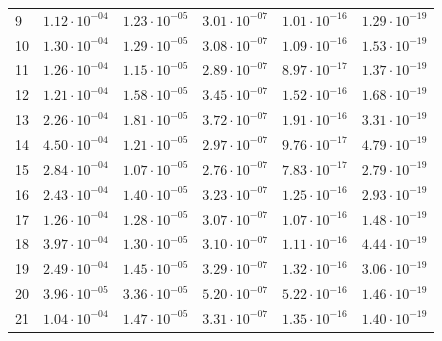 \begin{table}[h]
\begin{tabular}{llllll}
		9 &$\mathrm{1.12 \cdot 10^{-04}}$ & $\mathrm{1.23 \cdot 10^{-05}}$ & $\mathrm{3.01 \cdot 10^{-07}}$ & $\mathrm{1.01 \cdot 10^{-16}}$ & $\mathrm{1.29 \cdot 10^{-19}}$ \\
		10 &$\mathrm{1.30 \cdot 10^{-04}}$ & $\mathrm{1.29 \cdot 10^{-05}}$ & $\mathrm{3.08 \cdot 10^{-07}}$ & $\mathrm{1.09 \cdot 10^{-16}}$ & $\mathrm{1.53 \cdot 10^{-19}}$ \\
		11 &$\mathrm{1.26 \cdot 10^{-04}}$ & $\mathrm{1.15 \cdot 10^{-05}}$ & $\mathrm{2.89 \cdot 10^{-07}}$ & $\mathrm{8.97 \cdot 10^{-17}}$ & $\mathrm{1.37 \cdot 10^{-19}}$ \\
		12 &$\mathrm{1.21 \cdot 10^{-04}}$ & $\mathrm{1.58 \cdot 10^{-05}}$ & $\mathrm{3.45 \cdot 10^{-07}}$ & $\mathrm{1.52 \cdot 10^{-16}}$ & $\mathrm{1.68 \cdot 10^{-19}}$ \\
		13 &$\mathrm{2.26 \cdot 10^{-04}}$ & $\mathrm{1.81 \cdot 10^{-05}}$ & $\mathrm{3.72 \cdot 10^{-07}}$ & $\mathrm{1.91 \cdot 10^{-16}}$ & $\mathrm{3.31 \cdot 10^{-19}}$ \\
		14 &$\mathrm{4.50 \cdot 10^{-04}}$ & $\mathrm{1.21 \cdot 10^{-05}}$ & $\mathrm{2.97 \cdot 10^{-07}}$ & $\mathrm{9.76 \cdot 10^{-17}}$ & $\mathrm{4.79 \cdot 10^{-19}}$ \\
		15 &$\mathrm{2.84 \cdot 10^{-04}}$ & $\mathrm{1.07 \cdot 10^{-05}}$ & $\mathrm{2.76 \cdot 10^{-07}}$ & $\mathrm{7.83 \cdot 10^{-17}}$ & $\mathrm{2.79 \cdot 10^{-19}}$ \\
		16 &$\mathrm{2.43 \cdot 10^{-04}}$ & $\mathrm{1.40 \cdot 10^{-05}}$ & $\mathrm{3.23 \cdot 10^{-07}}$ & $\mathrm{1.25 \cdot 10^{-16}}$ & $\mathrm{2.93 \cdot 10^{-19}}$ \\
		17 &$\mathrm{1.26 \cdot 10^{-04}}$ & $\mathrm{1.28 \cdot 10^{-05}}$ & $\mathrm{3.07 \cdot 10^{-07}}$ & $\mathrm{1.07 \cdot 10^{-16}}$ & $\mathrm{1.48 \cdot 10^{-19}}$ \\
		18 &$\mathrm{3.97 \cdot 10^{-04}}$ & $\mathrm{1.30 \cdot 10^{-05}}$ & $\mathrm{3.10 \cdot 10^{-07}}$ & $\mathrm{1.11 \cdot 10^{-16}}$ & $\mathrm{4.44 \cdot 10^{-19}}$ \\
		19 &$\mathrm{2.49 \cdot 10^{-04}}$ & $\mathrm{1.45 \cdot 10^{-05}}$ & $\mathrm{3.29 \cdot 10^{-07}}$ & $\mathrm{1.32 \cdot 10^{-16}}$ & $\mathrm{3.06 \cdot 10^{-19}}$ \\
		20 &$\mathrm{3.96 \cdot 10^{-05}}$ & $\mathrm{3.36 \cdot 10^{-05}}$ & $\mathrm{5.20 \cdot 10^{-07}}$ & $\mathrm{5.22 \cdot 10^{-16}}$ & $\mathrm{1.46 \cdot 10^{-19}}$ \\
		21 &$\mathrm{1.04 \cdot 10^{-04}}$ & $\mathrm{1.47 \cdot 10^{-05}}$ & $\mathrm{3.31 \cdot 10^{-07}}$ & $\mathrm{1.35 \cdot 10^{-16}}$ & $\mathrm{1.40 \cdot 10^{-19}}$ \\

\end{tabular}
\end{table}
